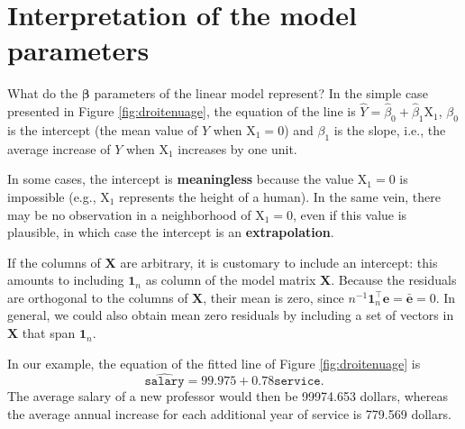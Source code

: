 \documentclass[
  11pt,
  letterpaper,
]{book}
\theoremstyle{definition}
\theoremstyle{definition}
\theoremstyle{definition}
\theoremstyle{remark}
\begin{document}
\hypertarget{interpretation-of-the-model-parameters}{%
\section{Interpretation of the model parameters}\label{interpretation-of-the-model-parameters}}

What do the \(\boldsymbol{\beta}\) parameters of the linear model represent? In the simple case presented in Figure \ref{fig:droitenuage}, the equation of the line is \(\widehat{Y} = \widehat{\beta}_0 + \widehat{\beta}_1\mathrm{X}_1\), \(\beta_0\) is the intercept (the mean value of \(Y\) when \(\mathrm{X}_1=0\)) and \(\beta_1\) is the slope, i.e., the average increase of \(Y\) when \(\mathrm{X}_1\) increases by one unit.

In some cases, the intercept is \textbf{meaningless} because the value \(\mathrm{X}_1=0\) is impossible (e.g., \(\mathrm{X}_1\) represents the height of a human). In the same vein, there may be no observation in a neighborhood of \(\mathrm{X}_1=0\), even if this value is plausible, in which case the intercept is an \textbf{extrapolation}.

If the columns of \(\mathbf{X}\) are arbitrary, it is customary to include an intercept: this amounts to including \(\mathbf{1}_n\) as column of the model matrix \(\mathbf{X}\). Because the residuals are orthogonal to the columns of \(\mathbf{X}\), their mean is zero, since \(n^{-1}\mathbf{1}_n^\top\boldsymbol{e}=\bar{\boldsymbol{e}}=0\). In general, we could also obtain mean zero residuals by including a set of vectors in \(\mathbf{X}\) that span \(\mathbf{1}_n\).

In our example, the equation of the fitted line of Figure \ref{fig:droitenuage} is \[\widehat{\texttt{salary}} = 99.975 + 0.78\texttt{service}.\]
The average salary of a new professor would then be 99974.653 dollars, whereas the average annual increase for each additional year of service is 779.569 dollars.
\end{document}
